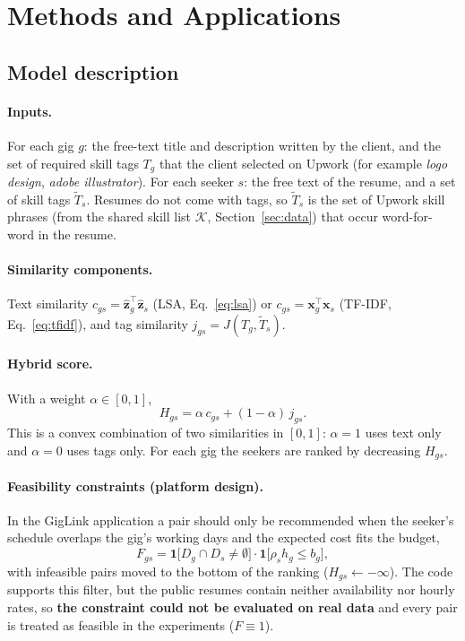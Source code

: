 \documentclass[12pt,a4paper]{article}
\numberwithin{equation}{section}
\theoremstyle{definition}
\theoremstyle{plain}
\begin{document}
\section{Methods and Applications}\label{sec:methods}

\subsection{Model description}\label{sec:model}

\paragraph{Inputs.} For each gig $g$: the free-text title and description written by the client, and the set of required skill tags $T_g$ that the client selected on Upwork (for example \emph{logo design}, \emph{adobe illustrator}). For each seeker $s$: the free text of the resume, and a set of skill tags $\tilde T_s$. Resumes do not come with tags, so $\tilde T_s$ is the set of Upwork skill phrases (from the shared skill list $\mathcal{K}$, Section~\ref{sec:data}) that occur word-for-word in the resume.

\paragraph{Similarity components.} Text similarity $c_{gs}=\hat{\bm z}_g^\top\hat{\bm z}_s$ (LSA, Eq.~\ref{eq:lsa}) or $c_{gs}=\bm{x}_g^\top\bm{x}_s$ (TF-IDF, Eq.~\ref{eq:tfidf}), and tag similarity $j_{gs}=J(T_g,\tilde T_s)$.

\paragraph{Hybrid score.} With a weight $\alpha\in[0,1]$,
\begin{equation}
  H_{gs} = \alpha\,c_{gs} + (1-\alpha)\,j_{gs}.
  \label{eq:hybrid}
\end{equation}
This is a convex combination of two similarities in $[0,1]$: $\alpha=1$ uses text only and $\alpha=0$ uses tags only. For each gig the seekers are ranked by decreasing $H_{gs}$.

\paragraph{Feasibility constraints (platform design).} In the GigLink application a pair should only be recommended when the seeker's schedule overlaps the gig's working days and the expected cost fits the budget,
\begin{equation}
  F_{gs} = \mathbf{1}\bigl[D_g\cap D_s\neq\emptyset\bigr]\cdot\mathbf{1}\bigl[\rho_s h_g\le b_g\bigr],
  \label{eq:feas}
\end{equation}
with infeasible pairs moved to the bottom of the ranking ($H_{gs}\gets-\infty$). The code supports this filter, but the public resumes contain neither availability nor hourly rates, so \textbf{the constraint could not be evaluated on real data} and every pair is treated as feasible in the experiments ($F\equiv 1$).
\end{document}
